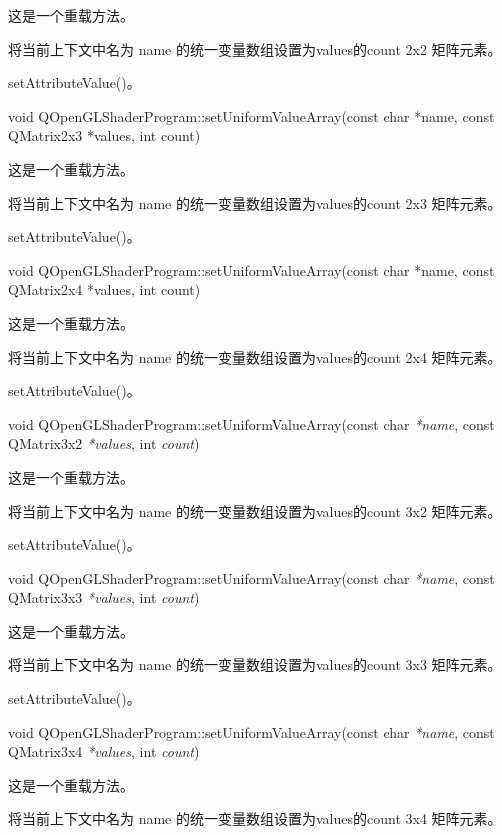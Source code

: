 这是一个重载方法。

将当前上下文中名为 name 的统一变量数组设置为values的count 2x2 矩阵元素。

\begin{seeAlso}
setAttributeValue()。
\end{seeAlso}

void QOpenGLShaderProgram::setUniformValueArray(const char *name, const QMatrix2x3 *values, int count)

这是一个重载方法。

将当前上下文中名为 name 的统一变量数组设置为values的count 2x3 矩阵元素。

\begin{seeAlso}
setAttributeValue()。
\end{seeAlso}

void QOpenGLShaderProgram::setUniformValueArray(const char *name, const QMatrix2x4 *values, int count)

这是一个重载方法。

将当前上下文中名为 name 的统一变量数组设置为values的count 2x4 矩阵元素。

\begin{seeAlso}
setAttributeValue()。
\end{seeAlso}

void QOpenGLShaderProgram::setUniformValueArray(const char \emph{*name}, const QMatrix3x2 \emph{*values}, int \emph{count})

这是一个重载方法。

将当前上下文中名为 name 的统一变量数组设置为values的count 3x2 矩阵元素。

\begin{seeAlso}
setAttributeValue()。
\end{seeAlso}

void QOpenGLShaderProgram::setUniformValueArray(const char \emph{*name}, const QMatrix3x3 \emph{*values}, int \emph{count})

这是一个重载方法。

将当前上下文中名为 name 的统一变量数组设置为values的count 3x3 矩阵元素。

\begin{seeAlso}
setAttributeValue()。
\end{seeAlso}

void QOpenGLShaderProgram::setUniformValueArray(const char \emph{*name}, const QMatrix3x4 \emph{*values}, int \emph{count})

这是一个重载方法。

将当前上下文中名为 name 的统一变量数组设置为values的count 3x4 矩阵元素。

